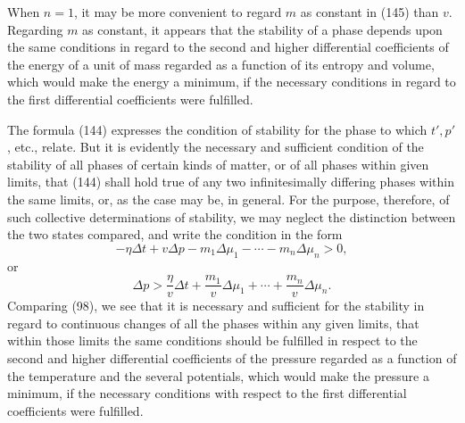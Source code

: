 \documentclass[11pt]{article}
\newcommand{\D}{\Delta}
\begin{document}
When $n=1$, it may be more convenient to regard $m$ as constant in (145) than $v$. Regarding $m$ as constant, it appears that the stability of a phase depends upon the same conditions in regard to the second and higher differential coefficients of the energy of a unit of mass regarded as a function of its entropy and volume, which would make the energy a minimum, if the necessary conditions in regard to the first differential coefficients were fulfilled.

The formula (144) expresses the condition of stability for the phase to which $t',p'$, etc., relate. But it is evidently the necessary and sufficient condition of the stability of all phases of certain kinds of matter, or of all phases within given limits, that (144) shall hold true of any two infinitesimally differing phases within the same limits, or, as the case may be, in general. For the purpose, therefore, of such collective determinations of stability, we may neglect the distinction between the two states compared, and write the condition in the form
\begin{equation}
-\eta\D t+v\D p-m_1\D\mu_1-\cdots-m_n\D\mu_n>0,
\end{equation}
or
\begin{equation}
\D p>\frac{\eta}{v}\D t+\frac{m_1}{v}\D\mu_1+\cdots+\frac{m_n}{v}\D\mu_n.
\end{equation}
Comparing (98), we see that it is necessary and sufficient for the stability in regard to continuous changes of all the phases within any given limits, that within those limits the same conditions should be fulfilled in respect to the second and higher differential coefficients of the pressure regarded as a function of the temperature and the several potentials, which would make the pressure a minimum, if the necessary conditions with respect to the first differential coefficients were fulfilled.
\end{document}
